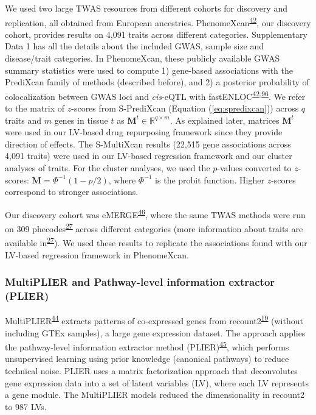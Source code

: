 \documentclass[
  a4paper,
]{article}
\begin{document}
We used two large TWAS resources from different cohorts for discovery and replication, all obtained from European ancestries.
PhenomeXcan\textsuperscript{\protect\hyperlink{ref-lY5ln3dB}{42}}, our discovery cohort, provides results on 4,091 traits across different categories.
Supplementary Data 1 has all the details about the included GWAS, sample size and disease/trait categories.
In PhenomeXcan, these publicly available GWAS summary statistics were used to compute
1) gene-based associations with the PrediXcan family of methods (described before), and
2) a posterior probability of colocalization between GWAS loci and \emph{cis}-eQTL with fastENLOC\textsuperscript{\protect\hyperlink{ref-lY5ln3dB}{42},\protect\hyperlink{ref-ndd3tW4g}{96}}.
We refer to the matrix of \(z\)-scores from S-PrediXcan (Equation (\ref{eq:spredixcan})) across \(q\) traits and \(m\) genes in tissue \(t\) as \(\mathbf{M}^{t} \in \mathbb{R}^{q \times m}\).
As explained later, matrices \(\mathbf{M}^{t}\) were used in our LV-based drug repurposing framework since they provide direction of effects.
The S-MultiXcan results (22,515 gene associations across 4,091 traits) were used in our LV-based regression framework and our cluster analyses of traits.
For the cluster analyses, we used the \(p\)-values converted to \(z\)-scores: \(\mathbf{M}=\Phi^{-1}(1 - p/2)\), where \(\Phi^{-1}\) is the probit function.
Higher \(z\)-scores correspond to stronger associations.

Our discovery cohort was eMERGE\textsuperscript{\protect\hyperlink{ref-wfqjCerX}{46}}, where the same TWAS methods were run on 309 phecodes\textsuperscript{\protect\hyperlink{ref-gZAOkumx}{27}} across different categories (more information about traits are available in\textsuperscript{\protect\hyperlink{ref-gZAOkumx}{27}}).
We used these results to replicate the associations found with our LV-based regression framework in PhenomeXcan.

\hypertarget{sec:methods:multiplier}{%
\subsubsection{MultiPLIER and Pathway-level information extractor (PLIER)}\label{sec:methods:multiplier}}

MultiPLIER\textsuperscript{\protect\hyperlink{ref-14rnBunuZ}{44}} extracts patterns of co-expressed genes from recount2\textsuperscript{\protect\hyperlink{ref-6SPTvFXq}{19}} (without including GTEx samples), a large gene expression dataset.
The approach applies the pathway-level information extractor method (PLIER)\textsuperscript{\protect\hyperlink{ref-Ki2ij7zE}{45}}, which performs unsupervised learning using prior knowledge (canonical pathways) to reduce technical noise.
PLIER uses a matrix factorization approach that deconvolutes gene expression data into a set of latent variables (LV), where each LV represents a gene module.
The MultiPLIER models reduced the dimensionality in recount2 to 987 LVs.
\end{document}
